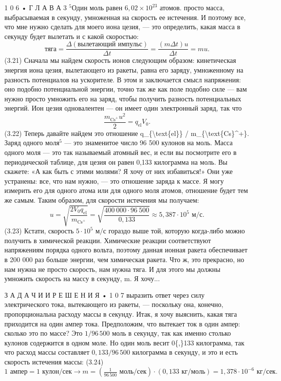\documentclass[10pt,oneside]{article}
\begin{document}
1 0 6 • Г Л А В А  3 \(^5\)Один моль равен \(6{,}02 \times 10^{23}\) атомов. просто масса, выбрасываемая в секунду, умноженная на скорость ее истечения. И поэтому все, что мне нужно сделать для моего иона цезия, --- это определить, какая масса в секунду будет вылетать и с какой скоростью: \[\text{тяга} = \frac{\Delta(\text{вылетающий импульс})}{\Delta t} = \frac{(m\Delta t) u}{\Delta t} = mu.\] (3.21) Сначала мы найдем скорость ионов следующим образом: кинетическая энергия иона цезия, вылетающего из ракеты, равна его заряду, умноженному на разность потенциалов на ускорителе. В этом и заключается смысл напряжения: оно подобно потенциальной энергии, точно так же как поле подобно силе --- вам нужно просто умножить его на заряд, чтобы получить разность потенциальных энергий. Ион цезия одновалентен --- он имеет один электронный заряд, так что \[\frac{m_{\text{Cs}^+} u^2}{2} = q_{\text{el}} V_0.\] (3.22) Теперь давайте найдем это отношение q\_\{\textbackslash{}text\{el\}\} / m\_\{\textbackslash{}text\{Cs\}\textasciicircum{}+\}. Заряд одного моля\(^5\) --- это знаменитое число 96 500 кулонов на моль. Масса одного моля --- это так называемый атомный вес, и если вы посмотрите его в периодической таблице, для цезия он равен 0,133 килограмма на моль. Вы скажете: «А как быть с этими молями? Я хочу от них избавиться!» Они уже устранены: все, что нам нужно, --- это отношение заряда к массе. Я могу измерить его для одного атома или для одного моля атомов, отношение будет тем же самым. Таким образом, для скорости истечения мы получаем: \[u = \sqrt{\frac{2 V_0 q_{\text{el}}}{m_{\text{Cs}^+}}} = \sqrt{\frac{400\ 000 \cdot 96\ 500}{0{,}133}} \approx 5{,}387 \cdot 10^5\text{ м/с}.\] (3.23) Кстати, скорость \(5 \cdot 10^5\text{ м/с}\) гораздо выше той, которую когда-либо можно получить в химической реакции. Химические реакции соответствуют напряжениям порядка одного вольта, поэтому данная ионная ракета обеспечивает в 200 000 раз больше энергии, чем химическая ракета. Что ж, это прекрасно, но нам нужна не просто скорость, нам нужна тяга. И для этого мы должны умножить скорость на массу в секунду, m. Я хочу...\par

З А Д А Ч И  И  Р Е Ш Е Н И Я • 1 0 7 выразить ответ через силу электрического тока, вытекающего из ракеты, --- поскольку она, конечно, пропорциональна расходу массы в секунду. Итак, я хочу выяснить, какая тяга приходится на один ампер тока. Предположим, что вытекает ток в один ампер: сколько это по массе? Это \(1/96\,500\) моль в секунду, так как именно столько кулонов содержится в одном моле. Но один моль весит 0\{,\}133 килограмма, так что расход массы составляет \(0{,}133/96\,500\) килограмма в секунду, и это и есть скорость истечения массы: (3.24) \(1\text{ ампер} = 1\text{ кулон/сек} \rightarrow m = \left(\frac{1}{96\,500}\text{ моль/сек}\right) \cdot (0{,}133\text{ кг/моль}) = 1{,}378 \cdot 10^{-6}\text{ кг/сек}.\)\par
\end{document}

